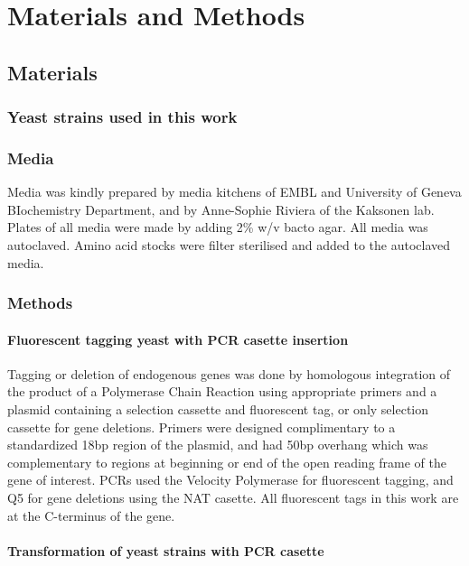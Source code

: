 \chapter{Materials and Methods} %

\section{Materials} 
\subsection{Yeast strains used in this work}

\subsection{Media}
Media was kindly prepared by media kitchens of EMBL and University of Geneva BIochemistry Department, and by Anne-Sophie Riviera of the Kaksonen lab. Plates of all media were made by adding 2\% w/v bacto agar.
All media was autoclaved. Amino acid stocks were filter sterilised and added to the autoclaved media.



\subsection{Methods}
\subsubsection{Fluorescent tagging yeast with PCR casette insertion}
Tagging or deletion of endogenous genes was done by homologous integration of the product of a Polymerase Chain Reaction using appropriate primers and a plasmid containing a selection cassette and fluorescent tag, or only selection cassette for gene deletions. Primers were designed complimentary to a standardized 18bp region of the plasmid, and had 50bp overhang which was complementary to regions at beginning or end of the open reading frame of the gene of interest. PCRs used the Velocity Polymerase for fluorescent tagging, and Q5 for gene deletions using the NAT casette. 
All fluorescent tags in this work are at the C-terminus of the gene.

\subsubsection{Transformation of yeast strains with PCR casette}

